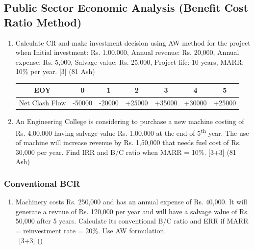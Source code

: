 \documentclass[12pt]{article}
\newcommand{\enter}{\\\textcolor{white}{1}}
\newcommand{\super}[1]{\textsuperscript{#1}}
\begin{document}
	\subsection{Public Sector Economic Analysis (Benefit Cost Ratio Method)}
		\begin{enumerate}
			\item Calculate CR and make investment decision using AW method for the project when Initial investment: Rs. 1,00,000, Annual revenue: Rs. 20,000, Annual expense: Rs. 5,000, Salvage value: Rs. 25,000, Project life: 10 years, MARR: 10\% per year. \hfill [3] (81 Ash)\\
				\begin{tabular}{|c|c|c|c|c|c|c|}
					\hline
					EOY & 0 & 1 & 2 & 3 & 4 & 5\\ \hline
					Net Clash Flow & -50000 & -20000 & +25000 & +35000 & +30000 & +25000\\ 
					\hline
				\end{tabular}
			
			\item An Engineering College is considering to purchase a new machine costing of Rs. 4,00,000 having salvage value Rs. 1,00,000 at the end of 5\super{th} year. The use of machine will increase revenue by Rs. 1,50,000 that needs fuel cost of Rs. 30,000 per year. Find IRR and B/C ratio when MARR = 10\%. \hfill [3+3] (81 Ash)
		\end{enumerate}

		\subsubsection{Conventional BCR}
			\begin{enumerate}[noitemsep, topsep=0pt]
				\item Machinery costs Rs. 250,000 and has an annual expense of Rs. 40,000. It will generate a revnue of Rs. 120,000 per year and will have a salvage value of Rs. 50,000 after 5 years. Calculate its conventional B/C ratio and ERR if MARR = reinvestment rate = 20\%. Use AW formulation. \enter\hfill [3+3] ()
			\end{enumerate}
\end{document}
